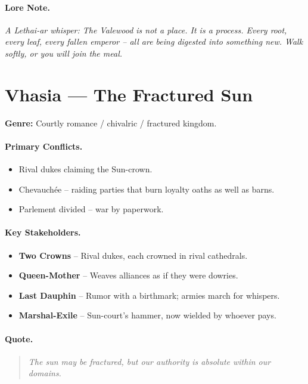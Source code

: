 \paragraph{Lore Note.}
\emph{A Lethai-ar whisper: \textquotedbl The Valewood is not a place. It is a process. Every root, every leaf, every fallen emperor -- all are being digested into something new. Walk softly, or you will join the meal.\textquotedbl}

\section{Vhasia --- \textquotedbl The Fractured Sun\textquotedbl}
\textbf{Genre:} Courtly romance / chivalric / fractured kingdom.

\paragraph{Primary Conflicts.}
\begin{itemize}
  \item Rival dukes claiming the Sun-crown.
  \item Chevauchée -- raiding parties that burn loyalty oaths as well as barns.
  \item Parlement divided -- war by paperwork.
\end{itemize}

\paragraph{Key Stakeholders.}
\begin{itemize}
  \item \textbf{Two Crowns} -- Rival dukes, each crowned in rival cathedrals.
  \item \textbf{Queen-Mother} -- Weaves alliances as if they were dowries.
  \item \textbf{Last Dauphin} -- Rumor with a birthmark; armies march for whispers.
  \item \textbf{Marshal-Exile} -- Sun-court's hammer, now wielded by whoever pays.
\end{itemize}

\paragraph{Quote.}
\begin{quote}
\emph{\textquotedbl The sun may be fractured, but our authority is absolute within our domains.\textquotedbl}
\end{quote}

